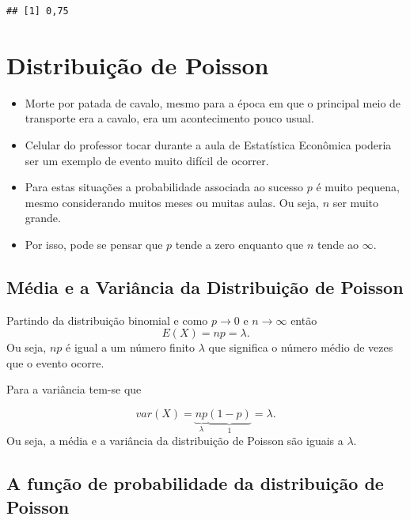 \documentclass[
]{book}
\providecommand{\tightlist}{%
  \setlength{\itemsep}{0pt}\setlength{\parskip}{0pt}}
\begin{document}
\begin{verbatim}
## [1] 0,75
\end{verbatim}

\hypertarget{distribuiuxe7uxe3o-de-poisson}{%
\section{Distribuição de Poisson}\label{distribuiuxe7uxe3o-de-poisson}}

\begin{itemize}
\tightlist
\item
  Morte por patada de cavalo, mesmo para a época em que o principal meio de
  transporte era a cavalo, era um acontecimento pouco usual.
\item
  Celular do professor tocar durante a aula de Estatística Econômica poderia ser um exemplo de evento muito difícil de ocorrer.
\item
  Para estas situações a probabilidade associada ao sucesso \(p\) é muito pequena, mesmo considerando muitos meses ou muitas aulas. Ou seja, \(n\) ser muito grande.
\item
  Por isso, pode se pensar que \(p\) tende a zero enquanto que \(n\) tende ao \(\infty\).
\end{itemize}

\hypertarget{muxe9dia-e-a-variuxe2ncia-da-distribuiuxe7uxe3o-de-poisson}{%
\subsection{Média e a Variância da Distribuição de Poisson}\label{muxe9dia-e-a-variuxe2ncia-da-distribuiuxe7uxe3o-de-poisson}}

Partindo da distribuição binomial e como \(p\rightarrow 0\) e \(n\rightarrow\infty\) então
\begin{equation*}
  E(X) = np = \lambda.
\end{equation*}
Ou seja, \(np\) é igual a um número finito \(\lambda\) que significa o número médio de vezes que o evento ocorre.

Para a variância tem-se que

\begin{equation*}
  var(X) = \underbrace{np}_{\lambda}\underbrace{(1 - p)}_{1} = \lambda.
\end{equation*}
Ou seja, a média e a variância da distribuição de Poisson são iguais a \(\lambda\).

\hypertarget{a-funuxe7uxe3o-de-probabilidade-da-distribuiuxe7uxe3o-de-poisson}{%
\subsection{A função de probabilidade da distribuição de Poisson}\label{a-funuxe7uxe3o-de-probabilidade-da-distribuiuxe7uxe3o-de-poisson}}
\end{document}
